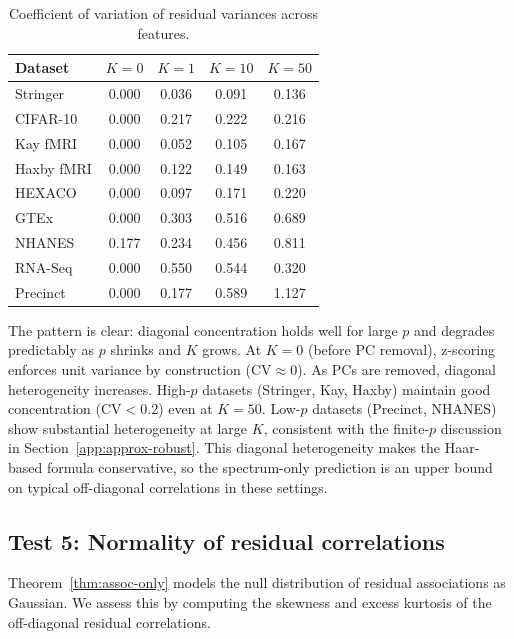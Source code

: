 \begin{table}[h]
\centering
\caption{Coefficient of variation of residual variances across features.}
\label{tab:diagconc}
\begin{tabular}{lcccc}
\toprule
Dataset & $K{=}0$ & $K{=}1$ & $K{=}10$ & $K{=}50$ \\
\midrule
Stringer    & 0.000 & 0.036 & 0.091 & 0.136 \\
CIFAR-10    & 0.000 & 0.217 & 0.222 & 0.216 \\
Kay fMRI    & 0.000 & 0.052 & 0.105 & 0.167 \\
Haxby fMRI  & 0.000 & 0.122 & 0.149 & 0.163 \\
HEXACO      & 0.000 & 0.097 & 0.171 & 0.220 \\
GTEx        & 0.000 & 0.303 & 0.516 & 0.689 \\
NHANES      & 0.177 & 0.234 & 0.456 & 0.811 \\
RNA-Seq     & 0.000 & 0.550 & 0.544 & 0.320 \\
Precinct    & 0.000 & 0.177 & 0.589 & 1.127 \\
\bottomrule
\end{tabular}
\end{table}

The pattern is clear: diagonal concentration holds well for large $p$ and degrades
predictably as $p$ shrinks and $K$ grows.
At $K{=}0$ (before PC removal), z-scoring enforces unit variance by construction
($\text{CV} \approx 0$). As PCs are removed, diagonal heterogeneity increases.
High-$p$ datasets (Stringer, Kay, Haxby) maintain good concentration
($\text{CV} < 0.2$) even at $K{=}50$.
Low-$p$ datasets (Precinct, NHANES) show substantial heterogeneity at large $K$,
consistent with the finite-$p$ discussion in Section~\ref{app:approx-robust}.
This diagonal heterogeneity makes the
Haar-based formula conservative, so the spectrum-only prediction is an upper bound on
typical off-diagonal correlations in these settings.

\subsection{Test 5: Normality of residual correlations}

Theorem~\ref{thm:assoc-only} models the null distribution of residual associations
as Gaussian. We assess this by computing the skewness and excess kurtosis
of the off-diagonal residual correlations.

